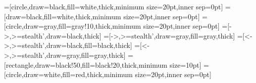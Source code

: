 =[circle,draw=black,fill=white,thick,minimum size=20pt,inner sep=0pt]
=[draw=black,fill=white,thick,minimum size=20pt,inner sep=0pt]
=[circle,draw=gray,fill=gray!10,thick,minimum size=20pt,inner sep=0pt]
=[->,>=stealth',draw=black,thick]
=[->,>=stealth',draw=gray,fill=gray,thick]
=[<->,>=stealth',draw=black,fill=black,thick]
=[<->,>=stealth',draw=gray,fill=gray,thick]
=[rectangle,draw=black!50,fill=black!20,thick,minimum size=10pt] %
=[circle,draw=white,fill=red,thick,minimum size=20pt,inner sep=0pt]

\renewcommand\emph[1]{\textbf{#1}}
